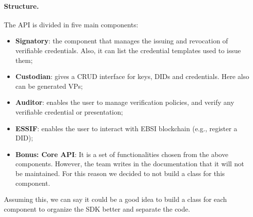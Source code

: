 \paragraph{Structure.}
The API is divided in five main components:
\begin{itemize}
    \item \textbf{Signatory}: the component that manages the issuing and
    revocation of verifiable credentials. Also, it can list the credential templates
    used to issue them;
    \item \textbf{Custodian}: gives a CRUD interface for keys, DIDs and credentials.
    Here also can be generated VPs;
    \item \textbf{Auditor}: enables the user to manage verification policies,
    and verify any verifiable credential or presentation;
    \item \textbf{ESSIF}: enables the user to interact with EBSI blockchain (e.g.,
    register a DID);
    \item \textbf{Bonus: Core API}: It is a set of functionalities chosen from the 
    above components. However, the team writes in the documentation that it will not 
    be maintained. For this reason we decided to not build a class for this component.
\end{itemize}
Assuming this, we can say it could be a good idea to build a class for each component 
to organize the SDK better and separate the code.

